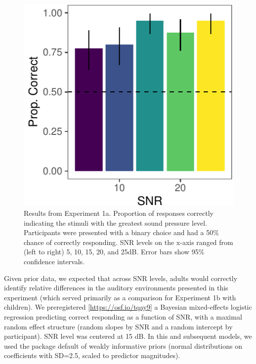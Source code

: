 \documentclass[10pt, letterpaper]{article}
\newenvironment{CodeChunk}{}{}
\begin{document}
\begin{CodeChunk}
\begin{figure}[t]

{\centering \includegraphics{figs/e1a-bar-1} 

}

\caption[Results from Experiment 1a]{Results from Experiment 1a. Proportion of responses correctly indicating the stimuli with the greatest sound pressure level. Participants were presented with a binary choice and had a 50\% chance of correctly responding. SNR levels on the x-axis ranged from (left to right) 5, 10, 15, 20, and 25dB. Error bars show 95\% confidence intervals.}\label{fig:e1a-bar}
\end{figure}
\end{CodeChunk}

Given prior data, we expected that across SNR levels, adults would
correctly identify relative differences in the auditory environments
presented in this experiment (which served primarily as a comparison for
Experiment 1b with children). We preregistered
{[}\url{https://osf.io/tqay9}{]} a Bayesian mixed-effects logistic
regression predicting correct responding as a function of SNR, with a
maximal random effect structure (random slopes by SNR and a random
intercept by participant). SNR level was centered at 15 dB. In this and
subsequent models, we used the package default of weakly informative
priors (normal distributions on coefficients with SD=2.5, scaled to
predictor magnitudes).
\end{document}
